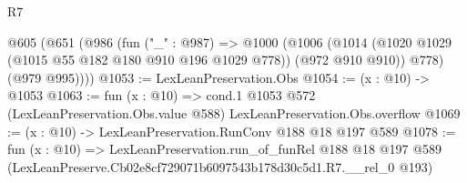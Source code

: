 \begin{lexlean}{R7}
\begin{coremodule}
  @605
    (@651
      (@986
        (fun ("_" : @987) =>
        @1000
          (@1006
            (@1014 (@1020 @1029 (@1015 @55 @182 @180 @910 @196 @1029 @778)) (@972 @910 @910))
            @778)
          (@979 @995))))
@1053 := LexLeanPreservation.Obs
@1054 := (x : @10) -> @1053
@1063 := fun (x : @10) =>
  cond.{1} @1053 @572 (LexLeanPreservation.Obs.value @588) LexLeanPreservation.Obs.overflow
@1069 := (x : @10) -> LexLeanPreservation.RunConv @188 @18 @197 @589
@1078 := fun (x : @10) =>
  LexLeanPreservation.run_of_funRel
    @188
    @18
    @197
    @589
    (LexLeanPreserve.Cb02e8cf729071b6097543b178d30c5d1.R7.__rel_0 @193)
\end{coremodule}
\end{lexlean}
